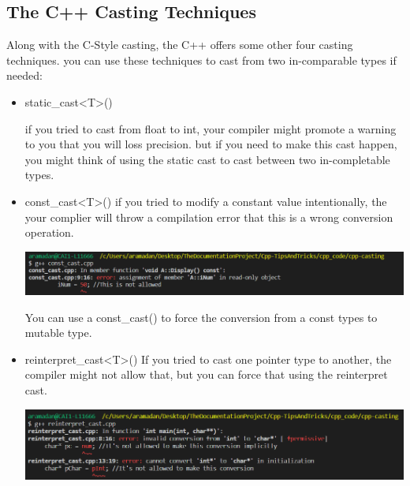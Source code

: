 \documentclass{article}
\begin{document}
\subsection{The C++ Casting Techniques}
Along with the C-Style casting, the C++ offers some other four casting techniques. you can use these techniques to cast from two in-comparable types if needed:
\begin{itemize}
  \item static\_cast<T>()
    
  if you tried to cast from float to int, your compiler might promote a warning to you that you will loss precision. but if you need to make this cast happen, you might think of using the static cast to cast between two in-completable types.

    

  \item const\_cast<T>()
  if you tried to modify a constant value intentionally, the your complier will throw a compilation error that this is a wrong conversion operation.

  \begin{center}
    \includegraphics[scale=0.50]{./imgs/cpp_casting/const_cast.PNG}
  \end{center}

    You can use a const\_cast() to force the conversion from a const types to mutable type.
    


  \item reinterpret\_cast<T>()
    If you tried to cast one pointer type to another, the compiler might not allow that, but you can force that using the reinterpret cast.

    \begin{center}
      \includegraphics[scale=0.50]{./imgs/cpp_casting/reinterpret_cast.PNG}
    \end{center}


\end{itemize}
\end{document}
